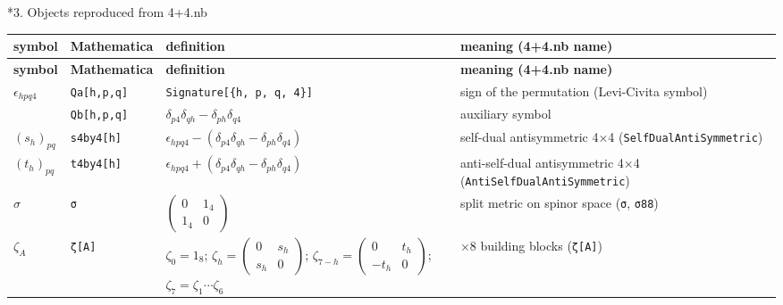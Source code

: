 \documentclass[10pt,a4paper]{article}
\makeatletter
\renewcommand\section{\@startsection{section}{1}{\z@}{-3.5ex \@plus -1ex \@minus -.2ex}{2.3ex \@plus.2ex}{\normalfont\Large\bfseries\raggedright}}
\makeatother
\begin{document}
\section*{3. Objects reproduced from 4+4.nb}
{\footnotesize
\begin{longtable}{>{\raggedright\arraybackslash}p{}>{\raggedright\arraybackslash}p{}>{\raggedright\arraybackslash}p{}>{\raggedright\arraybackslash}p{}}
\toprule
\textbf{symbol} & \textbf{Mathematica} & \textbf{definition} & \textbf{meaning (4+4.nb name)} \\
\midrule\endfirsthead
\toprule
\textbf{symbol} & \textbf{Mathematica} & \textbf{definition} & \textbf{meaning (4+4.nb name)} \\
\midrule\endhead
\endfoot
\bottomrule\endlastfoot
$\epsilon_{hpq4}$ & \texttt{Qa[h,p,q]} & \texttt{Signature[\{h, p, q, 4\}]} & sign of the permutation (Levi-Civita symbol) \\
 & \texttt{Qb[h,p,q]} & $\delta_{p4}\delta_{qh}-\delta_{ph}\delta_{q4}$ & auxiliary symbol \\
$(s_h)_{pq}$ & \texttt{s4by4[h]} & $\epsilon_{hpq4}-(\delta_{p4}\delta_{qh}-\delta_{ph}\delta_{q4})$ & self-dual antisymmetric 4×4 (\texttt{SelfDualAntiSymmetric}) \\
$(t_h)_{pq}$ & \texttt{t4by4[h]} & $\epsilon_{hpq4}+(\delta_{p4}\delta_{qh}-\delta_{ph}\delta_{q4})$ & anti-self-dual antisymmetric 4×4 (\texttt{AntiSelfDualAntiSymmetric}) \\
$\sigma$ & \texttt{σ} & $\left(\begin{smallmatrix}0&1_4\\1_4&0\end{smallmatrix}\right)$ & split metric on spinor space (\texttt{σ}, \texttt{σ88}) \\
$\zeta_A$ & \texttt{ζ[A]} & $\zeta_0=1_8$; $\zeta_h=\left(\begin{smallmatrix}0&s_h\\s_h&0\end{smallmatrix}\right)$; $\zeta_{7-h}=\left(\begin{smallmatrix}0&t_h\\-t_h&0\end{smallmatrix}\right)$; $\zeta_7=\zeta_1\cdots\zeta_6$ & 8×8 building blocks (\texttt{ζ[A]}) \\

\end{longtable}}
\end{document}
